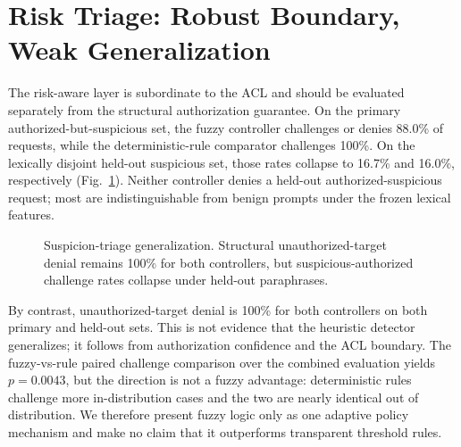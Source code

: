 \section{Risk Triage: Robust Boundary, Weak Generalization}
The risk-aware layer is subordinate to the ACL and should be evaluated separately from the structural authorization guarantee. On the primary authorized-but-suspicious set, the fuzzy controller challenges or denies 88.0\% of requests, while the deterministic-rule comparator challenges 100\%. On the lexically disjoint held-out suspicious set, those rates collapse to 16.7\% and 16.0\%, respectively (Fig.~\ref{fig:risk}). Neither controller denies a held-out authorized-suspicious request; most are indistinguishable from benign prompts under the frozen lexical features.

\begin{figure}[t]
\centering
{}
\caption{Suspicion-triage generalization. Structural unauthorized-target denial remains 100\% for both controllers, but suspicious-authorized challenge rates collapse under held-out paraphrases.}
\label{fig:risk}
\end{figure}

By contrast, unauthorized-target denial is 100\% for both controllers on both primary and held-out sets. This is not evidence that the heuristic detector generalizes; it follows from authorization confidence and the ACL boundary. The fuzzy-vs-rule paired challenge comparison over the combined evaluation yields $p=0.0043$, but the direction is not a fuzzy advantage: deterministic rules challenge more in-distribution cases and the two are nearly identical out of distribution. We therefore present fuzzy logic only as one adaptive policy mechanism and make no claim that it outperforms transparent threshold rules.

